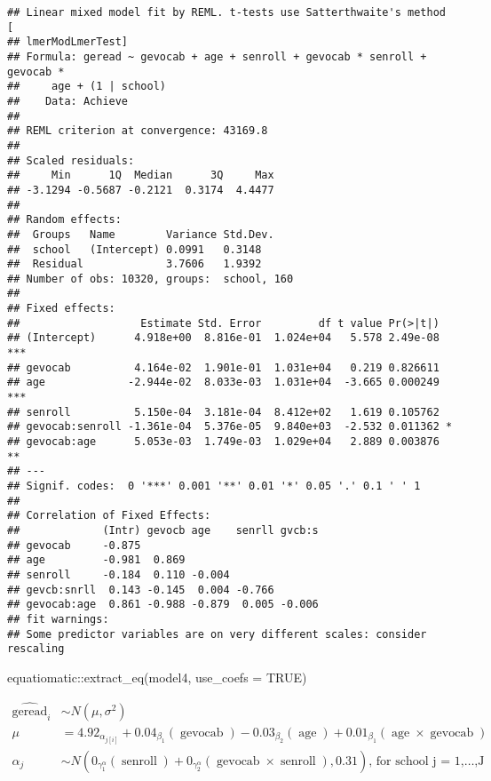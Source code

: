 \documentclass[
]{book}
\newenvironment{Shaded}{\begin{snugshade}}{\end{snugshade}}
\newcommand{\AttributeTok}[1]{\textcolor[rgb]{0.77,0.63,0.00}{#1}}
\newcommand{\ConstantTok}[1]{\textcolor[rgb]{0.00,0.00,0.00}{#1}}
\newcommand{\FunctionTok}[1]{\textcolor[rgb]{0.00,0.00,0.00}{#1}}
\newcommand{\NormalTok}[1]{#1}
\newcommand{\SpecialCharTok}[1]{\textcolor[rgb]{0.00,0.00,0.00}{#1}}
\begin{document}
\begin{verbatim}
## Linear mixed model fit by REML. t-tests use Satterthwaite's method [
## lmerModLmerTest]
## Formula: geread ~ gevocab + age + senroll + gevocab * senroll + gevocab *  
##     age + (1 | school)
##    Data: Achieve
## 
## REML criterion at convergence: 43169.8
## 
## Scaled residuals: 
##     Min      1Q  Median      3Q     Max 
## -3.1294 -0.5687 -0.2121  0.3174  4.4477 
## 
## Random effects:
##  Groups   Name        Variance Std.Dev.
##  school   (Intercept) 0.0991   0.3148  
##  Residual             3.7606   1.9392  
## Number of obs: 10320, groups:  school, 160
## 
## Fixed effects:
##                   Estimate Std. Error         df t value Pr(>|t|)    
## (Intercept)      4.918e+00  8.816e-01  1.024e+04   5.578 2.49e-08 ***
## gevocab          4.164e-02  1.901e-01  1.031e+04   0.219 0.826611    
## age             -2.944e-02  8.033e-03  1.031e+04  -3.665 0.000249 ***
## senroll          5.150e-04  3.181e-04  8.412e+02   1.619 0.105762    
## gevocab:senroll -1.361e-04  5.376e-05  9.840e+03  -2.532 0.011362 *  
## gevocab:age      5.053e-03  1.749e-03  1.029e+04   2.889 0.003876 ** 
## ---
## Signif. codes:  0 '***' 0.001 '**' 0.01 '*' 0.05 '.' 0.1 ' ' 1
## 
## Correlation of Fixed Effects:
##             (Intr) gevocb age    senrll gvcb:s
## gevocab     -0.875                            
## age         -0.981  0.869                     
## senroll     -0.184  0.110 -0.004              
## gevcb:snrll  0.143 -0.145  0.004 -0.766       
## gevocab:age  0.861 -0.988 -0.879  0.005 -0.006
## fit warnings:
## Some predictor variables are on very different scales: consider rescaling
\end{verbatim}

\begin{Shaded}
\begin{Highlighting}[]
\NormalTok{equatiomatic}\SpecialCharTok{::}\FunctionTok{extract\_eq}\NormalTok{(model4, }\AttributeTok{use\_coefs =} \ConstantTok{TRUE}\NormalTok{)}
\end{Highlighting}
\end{Shaded}

\[
\begin{aligned}
  \operatorname{\widehat{geread}}_{i}  &\sim N \left(\mu, \sigma^2 \right) \\
    \mu &=4.92_{\alpha_{j[i]}} + 0.04_{\beta_{1}}(\operatorname{gevocab}) - 0.03_{\beta_{2}}(\operatorname{age}) + 0.01_{\beta_{1}}(\operatorname{age} \times \operatorname{gevocab}) \\
    \alpha_{j}  &\sim N \left(0_{\gamma_{1}^{\alpha}}(\operatorname{senroll}) + 0_{\gamma_{2}^{\alpha}}(\operatorname{gevocab} \times \operatorname{senroll}), 0.31 \right)
    \text{, for school j = 1,} \dots \text{,J}
\end{aligned}
\]
\end{document}
